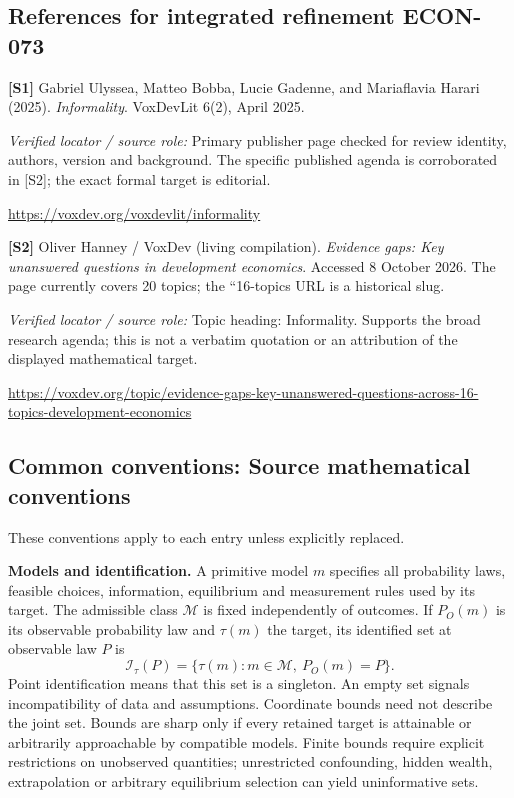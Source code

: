 \documentclass[11pt,a4paper]{article}
\begin{document}
\subsection*{References for integrated refinement ECON-073}
{\footnotesize\raggedright
\par\noindent\textbf{[S1]} Gabriel Ulyssea, Matteo Bobba, Lucie Gadenne, and Mariaflavia Harari (2025). \emph{Informality}. VoxDevLit 6(2), April 2025.\par \textit{Verified locator / source role:} Primary publisher page checked for review identity, authors, version and background. The specific published agenda is corroborated in [S2]; the exact formal target is editorial.\par \url{https://voxdev.org/voxdevlit/informality}\par\smallskip
\par\noindent\textbf{[S2]} Oliver Hanney / VoxDev (living compilation). \emph{Evidence gaps: Key unanswered questions in development economics}. Accessed 8 October 2026. The page currently covers 20 topics; the ``16-topics URL is a historical slug.\par \textit{Verified locator / source role:} Topic heading: Informality. Supports the broad research agenda; this is not a verbatim quotation or an attribution of the displayed mathematical target.\par \url{https://voxdev.org/topic/evidence-gaps-key-unanswered-questions-across-16-topics-development-economics}\par\smallskip
}

\subsection*{Common conventions: Source mathematical conventions}

These conventions apply to each entry unless explicitly replaced.

\textbf{Models and identification.} A primitive model \(m\) specifies all probability laws, feasible choices, information, equilibrium and measurement rules used by its target. The admissible class \(\mathcal M\) is fixed independently of outcomes. If \(P_O(m)\) is its observable probability law and \(\tau(m)\) the target, its identified set at observable law \(P\) is
\[
 \mathcal I_\tau(P)=\{\tau(m):m\in\mathcal M,\ P_O(m)=P\}.
\]
Point identification means that this set is a singleton. An empty set signals incompatibility of data and assumptions. Coordinate bounds need not describe the joint set. Bounds are sharp only if every retained target is attainable or arbitrarily approachable by compatible models. Finite bounds require explicit restrictions on unobserved quantities; unrestricted confounding, hidden wealth, extrapolation or arbitrary equilibrium selection can yield uninformative sets.
\end{document}
